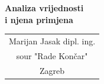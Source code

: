 \documentclass[a4paper,12pt]{article}
\numberwithin{figure}{section}
\begin{document}
\begin{titlepage}
\begin{titlepage}
  \null\vfill

  \begin{center}

  {\huge\bfseries Analiza vrijednosti \\ i njena primjena}
  \vskip 2cm
  
  \end{center}

\vfill


\begin{tabular}[t]{c}
Marijan Jasak dipl. ing.\\ sour "Rade Končar" \\ Zagreb
\end{tabular}
\hfill
\end{titlepage}
\end{titlepage}
\end{document}

